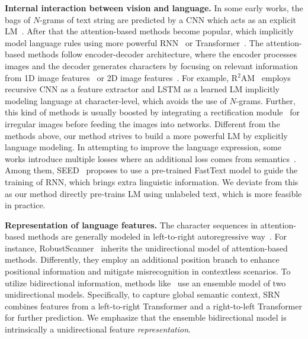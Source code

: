 \documentclass[10pt,journal,compsoc]{IEEEtran}
\begin{document}
\noindent\textbf{Internal interaction between vision and language.} In some early works, the bags of $N$-grams of text string are predicted by a CNN which acts as an explicit LM~\cite{jaderberg2015deep,jaderberg2014deep,jaderberg2014synthetic}. After that the attention-based methods become popular, which implicitly model language rules using more powerful RNN~\cite{lee2016recursive,shi2018aster} or Transformer~\cite{wang2019simple,sheng2019nrtr}. The attention-based methods follow encoder-decoder architecture, where the encoder processes images and the decoder generates characters by focusing on relevant information from 1D image features~\cite{lee2016recursive,shi2016robust,shi2018aster,cheng2017focusing,cheng2018aon} or 2D image features~\cite{yang2017learning,wojna2017attention,liao2019scene, li2019show}. For example, R$^2$AM~\cite{lee2016recursive} employs recursive CNN as a feature extractor and LSTM as a learned LM implicitly modeling language at character-level, which avoids the use of $N$-grams. Further, this kind of methods is usually boosted by integrating a rectification module~\cite{shi2018aster,zhan2019esir,yang2019symmetry} for irregular images before feeding the images into networks. Different from the methods above, our method strives to build a more powerful LM by explicitly language modeling. In attempting to improve the language expression, some works introduce multiple losses where an additional loss comes from semantics~\cite{qiao2020seed, lyu20192d, yu2020towards, fang2018attention}. Among them, SEED~\cite{qiao2020seed} proposes to use a pre-trained FastText model to guide the training of RNN, which brings extra linguistic information. We deviate from this as our method directly pre-trains LM using unlabeled text, which is more feasible in practice.


\noindent\textbf{Representation of language features.} The character sequences in attention-based methods are generally modeled in left-to-right autoregressive way~\cite{lee2016recursive, shi2016robust, cheng2017focusing, yue2020robustscanner}. For instance, RobustScanner~\cite{yue2020robustscanner} inherits the unidirectional model of attention-based methods. Differently, they employ an additional position branch to enhance positional information and mitigate misrecognition in contextless scenarios. To utilize bidirectional information, methods like~\cite{graves2008novel, shi2018aster, wang2020decoupled, yu2020towards} use an ensemble model of two unidirectional models. Specifically, to capture global semantic context, SRN~\cite{yu2020towards} combines features from a left-to-right Transformer and a right-to-left Transformer for further prediction. We emphasize that the ensemble bidirectional model is intrinsically a unidirectional feature \emph{representation}.
\end{document}
